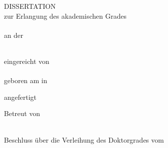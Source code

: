 \begin{titlepage}
\begin{center}

\null
\vspace{\baselineskip}
{\huge {\bfseries \tTitle \par}} 
\vspace{5\baselineskip}
DISSERTATION \\
\vspace{\baselineskip}
zur Erlangung des akademischen Grades \\
\vspace{\baselineskip}
\tDegree \\
\vspace{\baselineskip}
an der\\ \vspace{.2\baselineskip}{\large \bf Medizinischen Fakultät der Universität Leipzig} \\
\vspace{6\baselineskip}

\vfill

    \noindent
    eingereicht von \\
    \vspace{.75\baselineskip}
    {\bf \tAuthor} \\
    \vspace{.25\baselineskip}
    geboren am \tBirthday{} in \tNativeTown \\

\vspace{3\baselineskip}

    \noindent
    angefertigt 
    \tDepartment \\

\vspace{1.5\baselineskip}

    \noindent
    Betreut von \\
    \vspace{.5\baselineskip}
    \tSupervisor \\

\vspace{1.5\baselineskip}

    \noindent
    Beschluss über die Verleihung des Doktorgrades vom \tDefenceDate

\end{center}
\restoregeometry
\end{titlepage}

